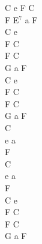 \documentclass[a5paper, 10pt]{book}
\begin{document}
\begin{minipage}[t]{0.3\textwidth}
  C e F C\\
  F E$^7$ a F\\
  C e\\
  F C\\
  F C\\
  G a F\\

  C e\\
  F C\\
  F C\\
  G a F\\

  C\\
  e a\\
  F\\
  C\\
  e a\\
  F\\

  C e\\
  F C\\
  F C\\
  G a F\\
\end{minipage}

\newpage
\end{document}
